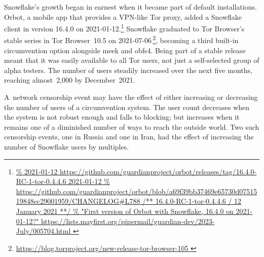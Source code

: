 \documentclass[letterpaper,twocolumn]{article}
\newlength{\urlfootnotesize}
\newcommand{\urlfootnote}[1]{\footnote{
\raggedright\fontsize{\urlfootnotesize}{\urlfootnotesize}\selectfont\url{#1}
}}
\begin{document}
Snowflake's growth began in earnest
when it became part of default installations.
Orbot, a mobile app that provides a VPN-like Tor proxy,
added a Snowflake client in version 16.4.0
on \mbox{2021-01-12}.\urlfootnote{
https://github.com/guardianproject/orbot/releases/tag/16.4.0-RC-1-tor-0.4.4.6 2021-01-12
}
Snowflake graduated to Tor Browser's stable series
in Tor Browser~10.5
on \mbox{2021-07-06}\,\urlfootnote{
https://blog.torproject.org/new-release-tor-browser-105
},
becoming a third built-in circumvention option
alongside meek and obfs4.
Being part of a stable release meant that it was
easily available to all Tor users,
not just a self-selected group of alpha testers.
The number of users steadily increased
over the next five months,
reaching almost~2,000 by December~2021.

A~network censorship event may have the effect
of either increasing or decreasing the number of users
of a circumvention system.
The user count decreases
when the system is not robust enough and falls to blocking;
but increases when it remains one
of a diminished number of ways to reach the outside world.
Two such censorship events,
one in Russia and one in Iran,
had the effect of increasing the number of Snowflake users
by multiples.
\end{document}
